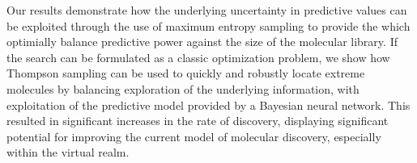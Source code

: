Our results demonstrate how the underlying uncertainty in predictive values can be exploited through the use of maximum entropy sampling to provide the which optimially balance predictive power against the size of the molecular library. If the search can be formulated as a classic optimization problem, we show how Thompson sampling can be used to quickly and robustly locate extreme molecules by balancing exploration of the underlying information, with exploitation of the predictive model provided by a Bayesian neural network. This resulted in significant increases in the rate of discovery, displaying significant potential for improving the current model of molecular discovery, especially within the virtual realm.
